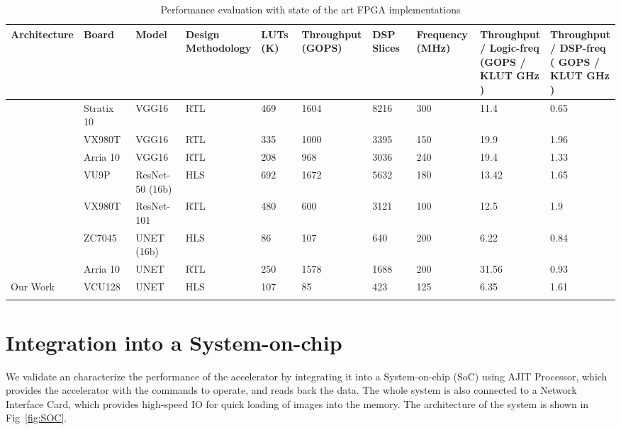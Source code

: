 \documentclass[a4paper,12pt, final]{report}
\begin{document}
\begin{table}
	\resizebox{\textwidth}{!}
	{\centering

\setlength{\tabcolsep}{1pt}
		\begin{tabular}{P{0.12\linewidth} P{0.12\linewidth} P{0.12\linewidth} P{0.08\linewidth} P{0.09\linewidth} P{0.12\linewidth} P{0.12\linewidth} P{0.12\linewidth} P{0.15\linewidth} P{0.15\linewidth}}
		\toprule
			Architecture & Board & Model & Design Methodology & LUTs (K) & Throughput (GOPS) & DSP Slices & Frequency (MHz) & Throughput / Logic-freq (GOPS / KLUT GHz ) & Throughput / DSP-freq ( GOPS / KLUT GHz )\\
		\toprule
			\cite{29} & Stratix 10 & VGG16 & RTL & 469 & 1604 & 8216 & 300 & 11.4 & 0.65\\\midrule
			\cite{28} & VX980T & VGG16 & RTL & 335 & 1000 & 3395 & 150 & 19.9 & 1.96\\\midrule
			\cite{29} & Arria 10 & VGG16 & RTL & 208 & 968 & 3036 & 240 & 19.4 & 1.33\\\midrule
			\cite{layerCons} & VU9P & ResNet-50 (16b) & HLS & 692 & 1672 & 5632 & 180 & 13.42 & 1.65\\\midrule
			\cite{28} & VX980T & ResNet-101 & RTL & 480 & 600 & 3121 & 100 & 12.5 & 1.9\\\midrule
			\cite{citeUNET1} & ZC7045 & UNET (16b) & HLS & 86 & 107 & 640 & 200 & 6.22 & 0.84\\\midrule
			\cite{citeUNET2} & Arria 10 & UNET & RTL & 250 & 1578 & 1688 & 200 & 31.56 & 0.93\\\midrule
			Our Work & VCU128 & UNET & HLS  & 107 & 85 & 423 & 125 & 6.35 & 1.61\\ 
		\bottomrule
		\\
	\end{tabular}
	}
	 \caption{Performance evaluation with state of the art FPGA implementations}
	 \label{tab:works}
\end{table}


\chapter{Integration into a System-on-chip}

We validate an characterize the performance of the accelerator by integrating it into a System-on-chip (SoC) using AJIT Processor, which provides the accelerator with the commands to operate, and reads back the data. The whole system is also connected to a Network Interface Card, which provides high-speed IO for quick loading of images into the memory. The architecture of the system is shown in Fig~\ref{fig:SOC}.
\\
\end{document}
